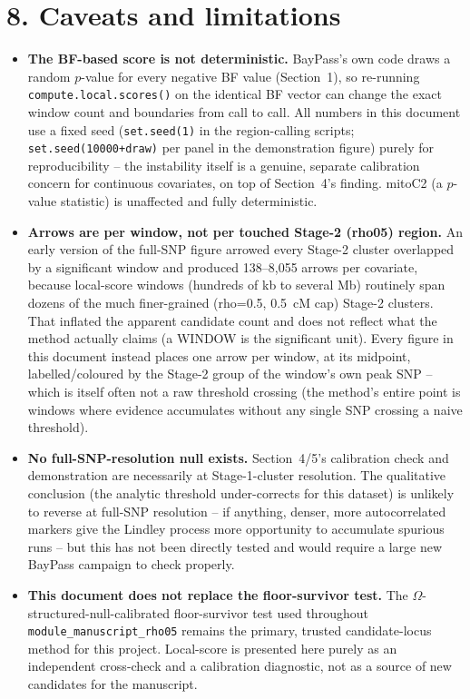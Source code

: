 \documentclass[11pt]{article}
\begin{document}
\section*{\color{Accent}8. Caveats and limitations}\label{sec:limitations}
\begin{itemize}
  \item \textbf{The BF-based score is not deterministic.} BayPass's own code draws a random
    $p$-value for every negative BF value (Section~1), so re-running
    \texttt{compute.local.scores()} on the identical BF vector can change the exact window
    count and boundaries from call to call. All numbers in this document use a fixed seed
    (\texttt{set.seed(1)} in the region-calling scripts; \texttt{set.seed(10000+draw)} per
    panel in the demonstration figure) purely for reproducibility -- the instability itself is
    a genuine, separate calibration concern for continuous covariates, on top of Section~4's
    finding. mitoC2 (a $p$-value statistic) is unaffected and fully deterministic.
  \item \textbf{Arrows are per window, not per touched Stage-2 (rho05) region.} An early
    version of the full-SNP figure arrowed every Stage-2 cluster overlapped by a significant
    window and produced 138--8{,}055 arrows per covariate, because local-score windows
    (hundreds of kb to several Mb) routinely span dozens of the much finer-grained
    (rho=0.5, 0.5~cM cap) Stage-2 clusters. That inflated the apparent candidate count and
    does not reflect what the method actually claims (a WINDOW is the significant unit).
    Every figure in this document instead places one arrow per window, at its midpoint,
    labelled/coloured by the Stage-2 group of the window's own peak SNP -- which is itself
    often not a raw threshold crossing (the method's entire point is windows where evidence
    accumulates without any single SNP crossing a naive threshold).
  \item \textbf{No full-SNP-resolution null exists.} Section~4/5's calibration check and
    demonstration are necessarily at Stage-1-cluster resolution. The qualitative conclusion
    (the analytic threshold under-corrects for this dataset) is unlikely to reverse at full-SNP
    resolution -- if anything, denser, more autocorrelated markers give the Lindley process
    more opportunity to accumulate spurious runs -- but this has not been directly tested and
    would require a large new BayPass campaign to check properly.
  \item \textbf{This document does not replace the floor-survivor test.} The
    $\Omega$-structured-null-calibrated floor-survivor test used throughout
    \texttt{module\_manuscript\_rho05} remains the primary, trusted candidate-locus method for
    this project. Local-score is presented here purely as an independent cross-check and a
    calibration diagnostic, not as a source of new candidates for the manuscript.
\end{itemize}
\end{document}

